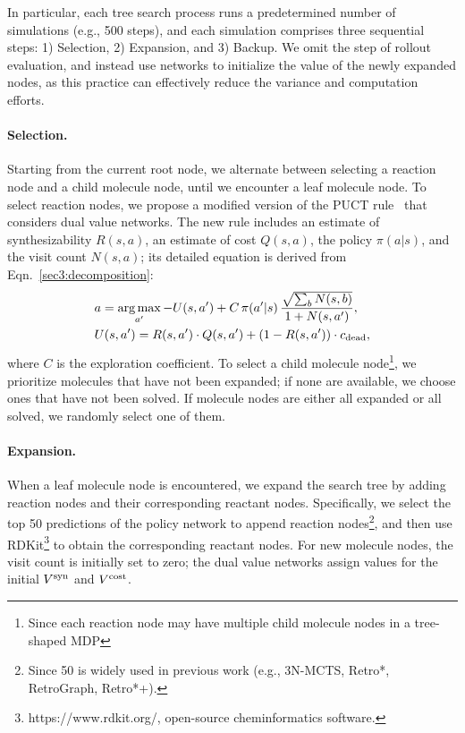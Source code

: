 \documentclass[nohyperref]{article}
\theoremstyle{plain}
\theoremstyle{definition}
\theoremstyle{remark}
\DeclareMathOperator*{\argmax}{arg\,max}
\begin{document}
In particular, each tree search process runs a predetermined number of simulations (e.g., 500 steps), and each simulation comprises three sequential steps: 1) Selection, 2) Expansion, and 3) Backup. We omit the step of rollout evaluation, and instead use networks to initialize the value of the newly expanded nodes, as this practice can effectively reduce the variance and computation efforts.

\paragraph{Selection.}
Starting from the current root node, we alternate between selecting a reaction node and a child molecule node, until we encounter a leaf molecule node.
To select reaction nodes,
we propose a modified version of the PUCT rule~\cite{rosin2011multi} that considers dual value networks.
The new rule includes an estimate of synthesizability $R(s, a)$, an estimate of cost $Q(s, a)$, the policy $\pi(a|s)$, and the visit count $N(s, a)$;
its detailed equation 
is derived from Eqn.~\ref{sec3:decomposition}:
\begin{equation}
\begin{aligned}
&a = \argmax_{a'} -U(s, a') + C \, \pi(a'|s) \, \frac{\sqrt{\sum_{b}N(s, b)}}{1 + N(s, a')}, \\
&U(s, a') = R(s, a') \cdot Q(s, a') + (1 - R(s, a')) \cdot c_{\rm dead},
\label{eq:puct}
\end{aligned}
\end{equation}
where $C$ is the exploration coefficient. 
To select a child molecule node\footnote{Since each reaction node may have multiple child molecule nodes in a tree-shaped MDP},
we prioritize molecules that have not been expanded;
if none are available, we choose ones that have not been solved. 
If molecule nodes are either all expanded or all solved, we randomly select one of them.


\paragraph{Expansion.}
When a leaf molecule node is encountered, we expand the search tree by adding reaction nodes and their corresponding reactant nodes. 
Specifically, we select the top 50 predictions of the policy network to append reaction nodes\footnote{Since 50 is widely used in previous work (e.g., 3N-MCTS, Retro*, RetroGraph, Retro*+). 
}, and then use RDKit\footnote{https://www.rdkit.org/, open-source cheminformatics software.} to obtain the corresponding reactant nodes. 
For new molecule nodes, the visit count is initially set to zero; the dual value networks assign values for the initial $V^{\rm syn}$ and $V^{\rm cost}$. 
\end{document}
